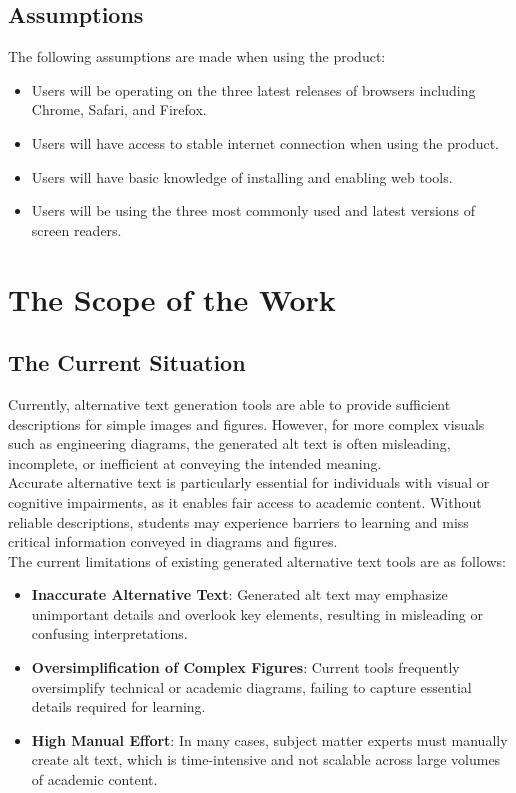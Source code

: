 \documentclass[12pt]{article}
\begin{document}
\subsection{Assumptions}
The following assumptions are made when using the product:
\begin{itemize}
  \item Users will be operating on the three latest releases of
    browsers including Chrome, Safari, and Firefox.
  \item Users will have access to stable internet connection when
    using the product.
  \item Users will have basic knowledge of installing and enabling web tools.
  \item Users will be using the three most commonly used and latest
    versions of screen readers.
\end{itemize}
\section{The Scope of the Work}
\subsection{The Current Situation}
Currently, alternative text generation tools are able to provide
sufficient descriptions for simple images and figures. However, for
more complex visuals
such as engineering diagrams, the generated alt text is often
misleading, incomplete, or inefficient at conveying the intended meaning.\\
Accurate alternative text is particularly essential for individuals
with visual or cognitive impairments, as it enables fair access to
academic content. Without
reliable descriptions, students may experience barriers to learning
and miss critical information conveyed in diagrams and figures.\\
The current limitations of existing generated alternative text tools
are as follows:
\begin{itemize}
  \item \textbf{Inaccurate Alternative Text}: Generated alt text may
    emphasize unimportant details and overlook key elements,
    resulting in misleading or confusing interpretations.
  \item \textbf{Oversimplification of Complex Figures}: Current tools
    frequently oversimplify technical or academic diagrams,
    failing to capture essential details required for learning.
  \item \textbf{High Manual Effort}: In many cases, subject matter
    experts must manually create alt text,
    which is time-intensive and not scalable across large volumes of
    academic content.
\end{itemize}
\end{document}
